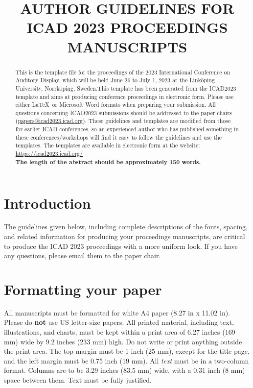 \documentclass[a4paper,10pt,oneside]{article}
\title{AUTHOR GUIDELINES FOR ICAD 2023 PROCEEDINGS MANUSCRIPTS}
\begin{document}
\ninept
\maketitle
\begin{sloppy}
\begin{abstract}
This is the template file for the proceedings of the 2023 International Conference on Auditory Display, which will be held June 26 to July 1, 2023 at the Linköping University, Norrköping, Sweden.This template has been generated from the ICAD2023 template and aims at producing conference proceedings in electronic form. Please use either \LaTeX\ or Microsoft Word formats when preparing your submission. All questions concerning ICAD2023 submissions should be addressed to the paper chairs (\href{mailto:papers@icad2023.icad.org}{papers@icad2023.icad.org}). These guidelines and templates are modified from those for earlier ICAD conferences, so an experienced author who has published something in these conferences/workshops will find it easy to follow the guidelines and use the templates. The templates are available in electronic form at the website: \href{https://icad2023.icad.org/}{https://icad2023.icad.org/}\\
\bf{The length of the abstract should be approximately 150 words.}
\end{abstract}

\section{Introduction}
\label{sec:intro}

The guidelines given below, including complete descriptions of the fonts, spacing, and related information for producing your proceedings manuscripts, are critical to produce the ICAD 2023 proceedings with a more uniform look. If you have any questions, please email them to the paper chair.

\section{Formatting your paper}
\label{sec:format}

All manuscripts must be formatted for white A4 paper (8.27 in x 11.02 in). Please do \textbf{not} use US letter-size papers. All printed material, including text, illustrations, and charts, must be kept within a print area of 6.27 inches (169 mm) wide by 9.2 inches (233 mm) high. Do not write or print anything outside the print area. The top margin must be 1 inch (25 mm), except for the title page, and the left margin must be 0.75 inch (19 mm). All \textit{text} must be in a two-column format. Columns are to be 3.29 inches (83.5 mm) wide, with a 0.31 inch (8 mm) space between them. Text must be fully justified.


\end{sloppy}
\end{document}
